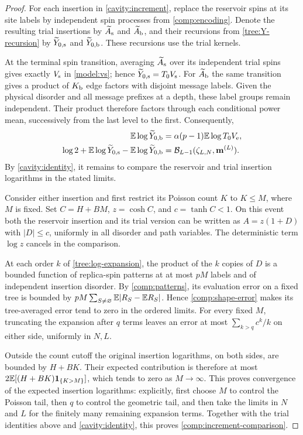 \begin{proof}
For each insertion in \cref{cavity:increment}, replace the reservoir spins
at its site labels by independent spin processes from \cref{comp:encoding}.
Denote the resulting trial insertions by $\widetilde A_{\rm s}$ and
$\widetilde A_{\rm b}$, and their recursions from
\eqref{tree:Y-recursion} by $\widetilde Y_{0,\rm s}$ and
$\widetilde Y_{0,\rm b}$. These recursions use the trial kernels.

At the terminal spin transition, averaging $\widetilde A_{\rm s}$ over
its independent trial spins gives exactly $V_{\rm s}$ in
\eqref{model:vs}; hence $\widetilde Y_{0,\rm s}=T_0V_{\rm s}$.
For $\widetilde A_{\rm b}$ the same transition gives a product of
$K_{\rm b}$ edge factors with disjoint message labels. Given the physical
disorder and all message prefixes at a depth, these label groups remain
independent. Their product therefore factors through each conditional
power mean, successively from the last level to the first. Consequently,
\[
 \begin{aligned}
 \mathbb E\log\widetilde Y_{0,\rm b}
 &=\alpha(p-1)\mathbb E\log T_0V_{\rm e},\\
 \log2+\mathbb E\log\widetilde Y_{0,\rm s}
       -\mathbb E\log\widetilde Y_{0,\rm b}
 &=\mathcal B_{L-1}(\zeta_{L,N},\mathbf m^{(L)}).
 \end{aligned}
\]
By \eqref{cavity:identity}, it remains to compare the reservoir and trial
insertion logarithms in the stated limits.

Consider either insertion and first restrict its
Poisson count $K$ to $K\le M$, where $M$ is fixed. Set
$C=H+BM$, $z=\cosh C$, and $c=\tanh C<1$. On this event both the reservoir
insertion and its trial version can be written as
$A=z(1+D)$ with $|D|\le c$, uniformly in all disorder and path variables.
The deterministic term $\log z$ cancels in the comparison.

At each order $k$ of \cref{tree:log-expansion}, the product of the $k$
copies of $D$ is a bounded function of replica-spin patterns at at most
$pM$ labels and of independent insertion disorder. By
\cref{comp:patterns}, its evaluation error on a fixed tree is bounded by
$pM\sum_{S\ne\varnothing}\mathbb E|R_S-\mathbb E R_S|$. Hence
\eqref{comp:shape-error} makes its tree-averaged error tend to zero in the
ordered limits. For every fixed $M$, truncating the expansion after $q$
terms leaves an error at most
$\sum_{k>q}c^k/k$ on either side, uniformly in $N,L$.

Outside the count cutoff the original insertion logarithms, on both sides,
are bounded by $H+BK$. Their expected contribution is therefore at most
$2\mathbb E[(H+BK)\mathbf1_{\{K>M\}}]$, which tends to zero as $M\to\infty$.
This proves convergence of the expected insertion logarithms: explicitly,
first choose $M$ to control the Poisson tail, then $q$ to control the
geometric tail, and then take the limits in $N$ and $L$ for the finitely
many remaining expansion terms. Together with the trial identities above
and \eqref{cavity:identity}, this proves \eqref{comp:increment-comparison}.
\end{proof}

